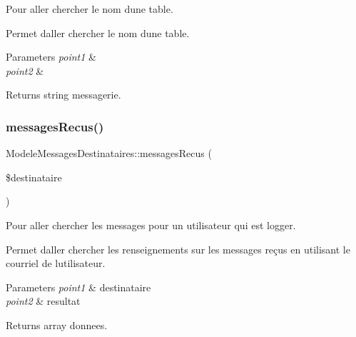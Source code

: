 Pour aller chercher le nom d\textquotesingle{}une table. 

Permet d\textquotesingle{}aller chercher le nom d\textquotesingle{}une table. 
\begin{DoxyParams}{Parameters}
{\em point1} & \\
\hline
{\em point2} & \\
\hline
\end{DoxyParams}
\begin{DoxyReturn}{Returns}
string messagerie. 
\end{DoxyReturn}
\mbox{\label{class_modele_messages_destinataires_ac4cb5db977098c6012898e3016c4be39}} 
\subsubsection{\texorpdfstring{messages\+Recus()}{messagesRecus()}}
{\footnotesize\ttfamily Modele\+Messages\+Destinataires\+::messages\+Recus (\begin{DoxyParamCaption}\item[{}]{\$destinataire }\end{DoxyParamCaption})}



Pour aller chercher les messages pour un utilisateur qui est logger. 

Permet d\textquotesingle{}aller chercher les renseignements sur les messages reçus en utilisant le courriel de l\textquotesingle{}utilisateur. 
\begin{DoxyParams}{Parameters}
{\em point1} & destinataire \\
\hline
{\em point2} & resultat \\
\hline
\end{DoxyParams}
\begin{DoxyReturn}{Returns}
array donnees. 
\end{DoxyReturn}
\mbox{\label{class_modele_messages_destinataires_a2ecb7e51d9c7e8f115fd42c610392a3b}} 
